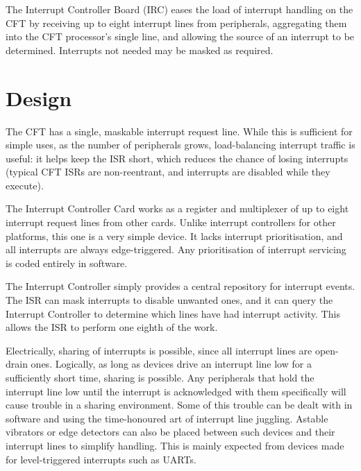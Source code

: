 

The Interrupt Controller Board (IRC) eases the load of interrupt handling on
the CFT by receiving up to eight interrupt lines from peripherals, aggregating
them into the CFT processor's single  line, and allowing the source of
an interrupt to be determined. Interrupts not needed may be masked as required.

\section{Design}

The CFT has a single, maskable interrupt request line. While this is sufficient
for simple uses, as the number of peripherals grows, load-balancing interrupt
traffic is useful: it helps keep the \gls{ISR} short, which reduces the chance
of losing interrupts (typical CFT ISRs are non-reentrant, and interrupts are
disabled while they execute).

The Interrupt Controller Card works as a register and multiplexer of up to
eight interrupt request lines from other cards. Unlike interrupt controllers
for other platforms, this one is a very simple device. It lacks interrupt
prioritisation, and all interrupts are always edge-triggered. Any
prioritisation of interrupt servicing is coded entirely in software.

The Interrupt Controller simply provides a central repository for interrupt
events. The ISR can mask interrupts to disable unwanted ones, and it can query
the Interrupt Controller to determine which lines have had interrupt
activity. This allows the ISR to perform one eighth of the work.

Electrically, sharing of interrupts is possible, since all interrupt lines are
open-drain ones. Logically, as long as devices drive an interrupt line low for
a sufficiently short time, sharing is possible. Any peripherals that hold the
interrupt line low until the interrupt is acknowledged with them specifically
will cause trouble in a sharing environment. Some of this trouble can be dealt
with in software and using the time-honoured art of interrupt line
juggling. Astable vibrators or edge detectors can also be placed between such
devices and their interrupt lines to simplify handling. This is mainly expected
from devices made for level-triggered interrupts such as \glspl{UART}.

